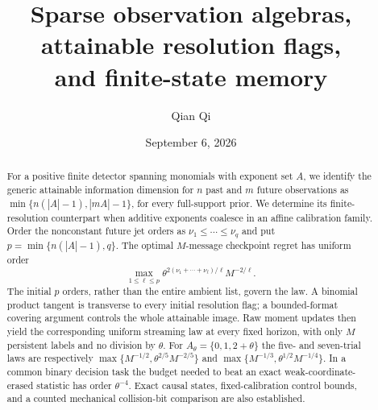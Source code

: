 \documentclass[11pt]{amsart}
\title[Attainable resolution flags and memory]{Sparse observation algebras, attainable resolution flags,\\ and finite-state memory}
\author{Qian Qi}
\date{September 6, 2026}
\theoremstyle{definition}\newtheorem{definition}[theorem]{Definition}
\theoremstyle{remark}\newtheorem{remark}[theorem]{Remark}
\begin{document}
\begin{abstract}
For a positive finite detector spanning monomials with exponent set $A$,
we identify the generic attainable information dimension for $n$ past
and $m$ future observations as $\min\{n(|A|-1),|mA|-1\}$, for every
full-support prior. We determine its finite-resolution counterpart when
additive exponents coalesce in an affine calibration family. Order the
nonconstant future jet orders as $\nu_1\le\cdots\le\nu_q$ and put
$p=\min\{n(|A|-1),q\}$. The optimal $M$-message checkpoint regret has
uniform order
\[
 \max_{1\le\ell\le p}
    \theta^{2(\nu_1+\cdots+\nu_\ell)/\ell}M^{-2/\ell}.
\]
The initial $p$ orders, rather than the entire ambient list, govern the
law. A binomial product tangent is transverse to every initial resolution
flag; a bounded-format covering argument controls the whole attainable
image. Raw moment updates then yield the corresponding uniform streaming
law at every fixed horizon, with only $M$ persistent labels and no
division by $\theta$. For $A_\theta=\{0,1,2+\theta\}$ the five- and
seven-trial laws are respectively
$\max\{M^{-1/2},\theta^{2/5}M^{-2/5}\}$ and
$\max\{M^{-1/3},\theta^{1/2}M^{-1/4}\}$.
In a common binary decision task the budget needed to beat an exact
weak-coordinate-erased statistic has order $\theta^{-4}$.
Exact causal states, fixed-calibration control bounds, and a counted
mechanical collision-bit comparison are also established.
\end{abstract}
\maketitle












\end{document}
